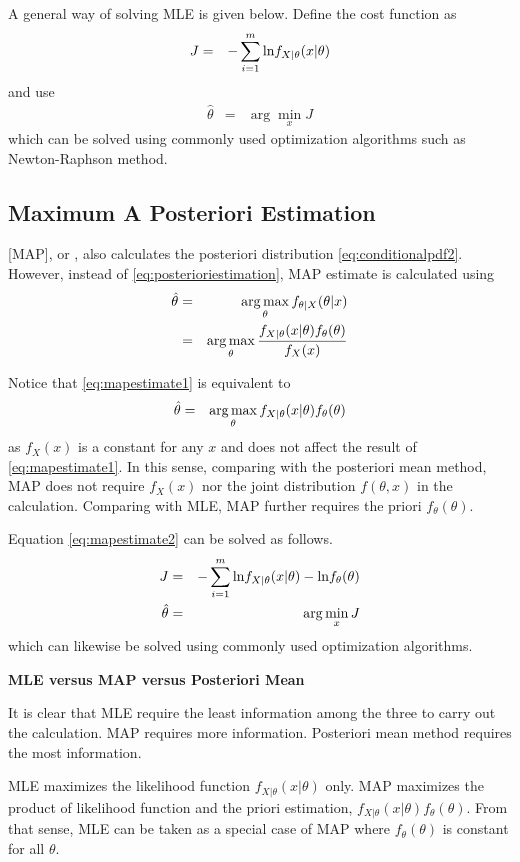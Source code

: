 A general way of solving MLE is given below. Define the cost function as
\begin{eqnarray}
	J &=& -\sum_{i=1}^{m}\textup{ln}f_{X|\theta}(x|\theta) \nonumber 	
\end{eqnarray}
and use 
\begin{eqnarray}
	\hat{\theta} &=& \arg\min_{x} J \nonumber
\end{eqnarray}
which can be solved using commonly used optimization algorithms such as Newton-Raphson method.

\subsection{Maximum A Posteriori Estimation}

[MAP], or , also calculates the posteriori distribution \eqref{eq:conditionalpdf2}. However, instead of \eqref{eq:posterioriestimation}, MAP estimate is calculated using
\begin{eqnarray}
	\hat{\theta} &=& \operatorname*{arg\,max}_\theta f_{\theta|X}(\theta|x) \nonumber \\
	&=&  \operatorname*{arg\,max}_\theta \dfrac{f_{X|\theta}(x|\theta)f_\theta(\theta)}{f_X(x)} \label{eq:mapestimate1}
\end{eqnarray}

Notice that \eqref{eq:mapestimate1} is equivalent to
\begin{eqnarray}
	\hat{\theta} &=& \operatorname*{arg\,max}_\theta f_{X|\theta}(x|\theta)f_\theta(\theta) \label{eq:mapestimate2}
\end{eqnarray}
as $f_X(x)$ is a constant for any $x$ and does not affect the result of \eqref{eq:mapestimate1}. In this sense, comparing with the posteriori mean method, MAP does not require $f_X(x)$ nor the joint distribution $f(\theta, x)$ in the calculation. Comparing with MLE, MAP further requires the priori $f_\theta(\theta)$.

Equation \eqref{eq:mapestimate2} can be solved as follows.
\begin{eqnarray}
	J &=& -\sum_{i=1}^{m}\textup{ln}f_{X|\theta}(x|\theta) - \textup{ln}f_\theta(\theta) \nonumber \\
	\hat{\theta} &=& \arg\min_{x} J \nonumber
\end{eqnarray}
which can likewise be solved using commonly used optimization algorithms.

\begin{mdframed}
	\noindent \textbf{MLE versus MAP versus Posteriori Mean}
	
	It is clear that MLE require the least information among the three to carry out the calculation. MAP requires more information. Posteriori mean method requires the most information.
	
	MLE maximizes the likelihood function $f_{X|\theta}(x|\theta)$ only. MAP maximizes the product of likelihood function and the priori estimation, $f_{X|\theta}(x|\theta)f_\theta(\theta)$. From that sense, MLE can be taken as a special case of MAP where $f_\theta(\theta)$ is constant for all $\theta$.
	
\end{mdframed}

